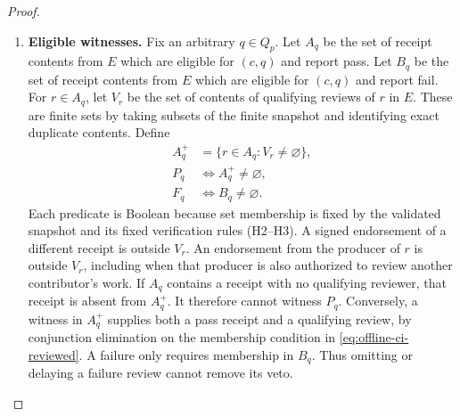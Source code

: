 \begin{proof}
\begin{enumerate}
\item \textbf{Eligible witnesses.}
Fix an arbitrary $q\in Q_p$.
Let $A_q$ be the set of receipt contents from $E$
which are eligible for $(c,q)$ and report pass.
Let $B_q$ be the set of receipt contents from $E$
which are eligible for $(c,q)$ and report fail.
For $r\in A_q$, let $V_r$ be the set of contents of qualifying
reviews of $r$ in $E$.
These are finite sets by taking subsets of the finite snapshot
and identifying exact duplicate contents.
Define
\begin{align}
   A_q^+ &= \{r\in A_q : V_r\ne\varnothing\},
      \label{eq:offline-ci-reviewed}\\
   P_q &\iff A_q^+\ne\varnothing,
      \label{eq:offline-ci-pass}\\
   F_q &\iff B_q\ne\varnothing .
      \label{eq:offline-ci-fail}
\end{align}
Each predicate is Boolean because set membership is fixed
by the validated snapshot and its fixed verification rules (H2--H3).
A signed endorsement of a different receipt is outside $V_r$.
An endorsement from the producer of $r$ is outside $V_r$,
including when that producer is also authorized to review
another contributor's work.
If $A_q$ contains a receipt with no qualifying reviewer,
that receipt is absent from $A_q^+$.
It therefore cannot witness $P_q$.
Conversely, a witness in $A_q^+$ supplies both a pass receipt
and a qualifying review, by conjunction elimination on the
membership condition in \eqref{eq:offline-ci-reviewed}.
A failure only requires membership in $B_q$.
Thus omitting or delaying a failure review cannot remove its veto.


\end{enumerate}
\end{proof}
